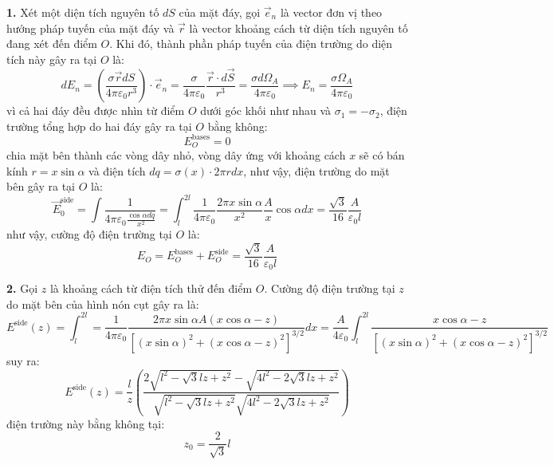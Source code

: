 \noindent\textbf{1.} Xét một diện tích nguyên tố $dS$ của mặt đáy, gọi $\vec{e}_{n}$ là vector đơn vị theo hướng pháp tuyến của mặt đáy và $\vec{r}$ là vector khoảng cách từ diện tích nguyên tố đang xét đến điểm $O$. Khi đó, thành phần pháp tuyến của điện trường do diện tích này gây ra tại $O$ là:
\begin{equation*}
  dE_{n}=\left(\frac{\sigma\vec{r}dS}{4\pi\varepsilon_{0}r^{3}}\right)\cdot\vec{e}_{n}=\frac{\sigma}{4\pi\varepsilon_{0}}\frac{\vec{r}\cdot d\vec{S}}{r^{3}}=\frac{\sigma d\Omega_{A}}{4\pi\varepsilon_{0}}\implies E_{n}=\frac{\sigma \Omega_{A}}{4\pi\varepsilon_{0}}
\end{equation*}
vì cả hai đáy đều được nhìn từ điểm $O$ dưới góc khối như nhau và $\sigma_{1}=-\sigma_{2}$, điện trường tổng hợp do hai đáy gây ra tại $O$ bằng không:
\begin{equation*}
  E_{O}^{\text{bases}}=0
\end{equation*}
chia mặt bên thành các vòng dây nhỏ, vòng dây ứng với khoảng cách $x$ sẽ có bán kính $r=x\sin\alpha$ và điện tích $dq=\sigma(x)\cdot 2\pi rdx$, như vậy, điện trường do mặt bên gây ra tại $O$ là:
\begin{equation*}
  \vec{E}_{0}^{\text{side}}=\int\frac{1}{4\pi\varepsilon_{0}\frac{\cos\alpha dq}{x^{2}}}=\int_{l}^{2l}\frac{1}{4\pi\varepsilon_{0}}\frac{2\pi x\sin\alpha}{x^{2}}\frac{A}{x}\cos\alpha dx=\frac{\sqrt{3}}{16}\frac{A}{\varepsilon_{0}l}
\end{equation*}
như vậy, cường độ điện trường tại $O$ là:
\begin{equation*}
  E_{O}=E_{O}^{\text{bases}}+E_{O}^{\text{side}}=\frac{\sqrt{3}}{16}\frac{A}{\varepsilon_{0}l}
\end{equation*}

\noindent\textbf{2.} Gọi $z$ là khoảng cách từ điện tích thử đến điểm $O$. Cường độ điện trường tại $z$ do mặt bên của hình nón cụt gây ra là:
\begin{equation*}
  E^{\text{side}}(z)=\int_{l}^{2l}=\frac{1}{4\pi\varepsilon_{0}}\frac{2\pi x\sin\alpha A(x\cos\alpha-z)}{[(x\sin\alpha)^{2}+(x\cos\alpha-z)^{2}]^{3/2}}dx=\frac{A}{4\varepsilon_{0}}\int_{l}^{2l}\frac{x\cos\alpha-z}{[(x\sin\alpha)^{2}+(x\cos\alpha-z)^{2}]^{3/2}}
\end{equation*}
suy ra:
\begin{equation*}
  E^{\text{side}}(z)=\frac{l}{z}\left(\frac{2\sqrt{l^{2}-\sqrt{3}lz+z^{2}}-\sqrt{4l^{2}-2\sqrt{3}lz+z^{2}}}{\sqrt{l^{2}-\sqrt{3}lz+z^{2}}\sqrt{4l^{2}-2\sqrt{3}lz+z^{2}}}\right)
\end{equation*}
điện trường này bằng không tại:
\begin{equation*}
  z_{0}=\frac{2}{\sqrt{3}}l
\end{equation*}

